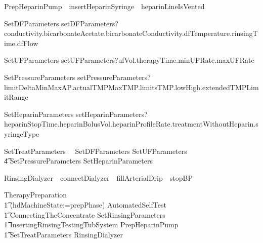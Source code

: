 \begin{circus}
  PrepHeparinPump~\circdef~insertHeparinSyringe~\then~heparinLineIsVented~\then~\Skip

  SetDFParameters \circdef
    setDFParameters?conductivity.bicarbonateAcetate.bicarbonateConductivity.dfTemperature.rinsingTime.dfFlow \then \Skip

  SetUFParameters \circdef
    setUFParameters?ufVol.therapyTime.minUFRate.maxUFRate \then \Skip

  SetPressureParameters \circdef
    setPressureParameters?limitDeltaMinMaxAP.actualTMPMaxTMP.limitsTMP.lowHigh.extendedTMPLimitRange \then \Skip

  SetHeparinParameters \circdef
    setHeparinParameters?heparinStopTime.heparinBolusVol.heparinProfileRate.treatmentWithoutHeparin.syringeType \then \Skip

  SetTreatParameters~\circdef~ SetDFParameters \circseq SetUFParameters \circseq
  \\\t4 SetPressureParameters \circseq SetHeparinParameters

  RinsingDialyzer~\circdef~connectDialyzer~\then~fillArterialDrip~\then~stopBP~\then~\Skip

  TherapyPreparation~\circdef
    \\\t1 (hdMachineState:=prepPhase) \circseq AutomatedSelfTest \circseq
    \\\t1 ConnectingTheConcentrate \circseq SetRinsingParameters \circseq
    \\\t1 InsertingRinsingTestingTubSystem \circseq PrepHeparinPump \circseq
    \\\t1 SetTreatParameters \circseq RinsingDialyzer


\end{circus}
